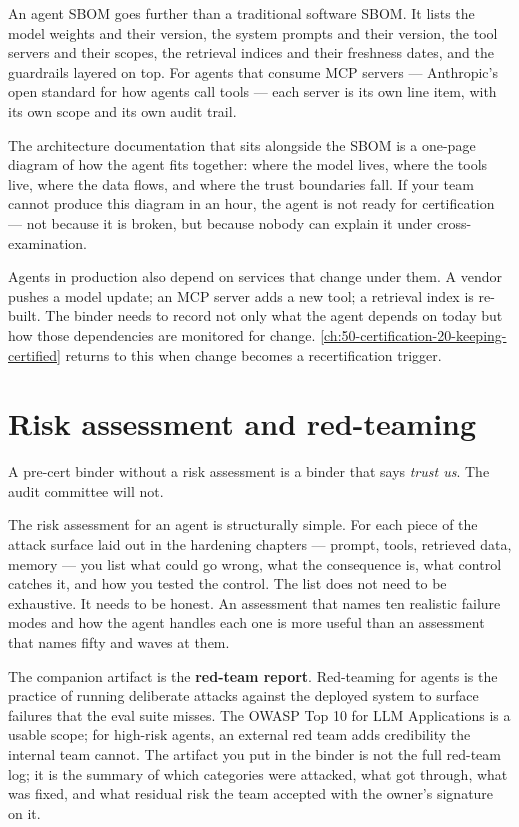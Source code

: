 An agent SBOM goes further than a traditional software SBOM. It lists the model weights and their version, the system prompts and their version, the tool servers and their scopes, the retrieval indices and their freshness dates, and the guardrails layered on top. For agents that consume MCP servers --- Anthropic's open standard for how agents call tools --- each server is its own line item, with its own scope and its own audit trail.

The architecture documentation that sits alongside the SBOM is a one-page diagram of how the agent fits together: where the model lives, where the tools live, where the data flows, and where the trust boundaries fall. If your team cannot produce this diagram in an hour, the agent is not ready for certification --- not because it is broken, but because nobody can explain it under cross-examination.

Agents in production also depend on services that change under them. A vendor pushes a model update; an MCP server adds a new tool; a retrieval index is re-built. The binder needs to record not only what the agent depends on today but how those dependencies are monitored for change. \autoref{ch:50-certification-20-keeping-certified} returns to this when change becomes a recertification trigger.

\section{Risk assessment and red-teaming}

A pre-cert binder without a risk assessment is a binder that says \textit{trust us}. The audit committee will not.

The risk assessment for an agent is structurally simple. For each piece of the attack surface laid out in the hardening chapters --- prompt, tools, retrieved data, memory --- you list what could go wrong, what the consequence is, what control catches it, and how you tested the control. The list does not need to be exhaustive. It needs to be honest. An assessment that names ten realistic failure modes and how the agent handles each one is more useful than an assessment that names fifty and waves at them.

The companion artifact is the \textbf{red-team report}. Red-teaming for agents is the practice of running deliberate attacks against the deployed system to surface failures that the eval suite misses. The OWASP Top 10 for LLM Applications \citep{owaspLLM2025} is a usable scope; for high-risk agents, an external red team adds credibility the internal team cannot. The artifact you put in the binder is not the full red-team log; it is the summary of which categories were attacked, what got through, what was fixed, and what residual risk the team accepted with the owner's signature on it.

